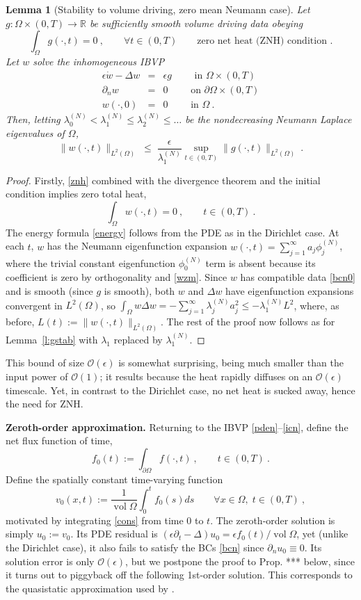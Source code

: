 \documentclass[10pt]{article}
\newcommand{\be}{\begin{equation}}
\newcommand{\ee}{\end{equation}}
\newcommand{\bea}{\begin{eqnarray}}
\newcommand{\eea}{\end{eqnarray}}
\newcommand{\R}{\mathbb{R}}
\newcommand{\bigO}{{\mathcal O}}
\DeclareMathOperator{\vol}{vol}
\newtheorem{lem}[thm]{Lemma}
\newcommand{\pO}{{\partial\Omega}}
\newcommand{\eps}{\epsilon}
\newcommand{\dn}{\partial_n}
\newcommand{\dt}{\partial_t}
\newcommand{\LTO}{{L^2(\Omega)}}
\begin{document}
\begin{lem}[Stability to volume driving, zero mean Neumann case]
  Let $g: \Omega\times(0,T) \to\R$ be sufficiently smooth
  volume driving data obeying
  \be
  \int_\Omega g(\cdot,t)=0~, \qquad \forall t\in(0,T)
  \qquad\mbox{zero net heat (ZNH) condition~.}
  \label{znh}
  \ee
  Let $w$ solve the inhomogeneous IBVP
  \bea
  \eps\dot{w} - \Delta w &=& \eps g    \qquad \mbox{ in } \Omega\times (0,T)
  \\
  \dn w  &=& 0  \qquad \mbox{ on } \pO \times (0,T)
  \label{bcn0}
  \\
  w(\cdot, 0)    &=&  0 \qquad \mbox{ in } \Omega~.
  \eea
  Then, letting $\lambda_0^{(N)}<
  \lambda_1^{(N)} \le \lambda_2^{(N)} \le \dots$
  be the nondecreasing Neumann Laplace eigenvalues of $\Omega$,
  \be
  \|w(\cdot,t)\|_\LTO \;\le\;
  \frac{\eps}{\lambda_1^{(N)}} \sup_{t\in(0,T)} \|g(\cdot,t)\|_\LTO
  ~.
  \label{gstabn}
  \ee
  \label{l:gstabn}
\end{lem}
\begin{proof}
  Firstly, \eqref{znh} combined with the divergence theorem
  and the initial condition implies zero total heat,
  \be
  \int_\Omega w(\cdot,t) = 0 ~, \qquad t \in (0,T)~.
  \label{wzm}
  \ee
  The energy formula \eqref{energy} follows from the PDE
  as in the Dirichlet case.
  At each $t$, $w$ has the Neumann eigenfunction expansion
  $w(\cdot,t) = \sum_{j=1}^\infty a_j \phi_j^{(N)}$, where the
  trivial constant eigenfunction $\phi_0^{(N)}$ term
  is absent because its coefficient is zero by orthogonality and \eqref{wzm}.
  Since $w$ has compatible data \eqref{bcn0} and is smooth
  (since $g$ is smooth),
  both $w$ and $\Delta w$ have eigenfunction expansions convergent
  in $\LTO$, so
  $\int_\Omega w \Delta w = -\sum_{j=1}^\infty \lambda_j^{(N)} a_j^2 \le
  -\lambda_1^{(N)} L^2$,
  where, as before, $L(t) := \|w(\cdot,t)\|_\LTO$.
  The rest of the proof now follows as for Lemma~\ref{l:gstab}
  with $\lambda_1$ replaced by $\lambda_1^{(N)}$.
  \end{proof}

This bound of size $\bigO(\eps)$ is somewhat surprising, being 
much smaller than the input power of $\bigO(1)$;
it results because the heat rapidly diffuses
on an $\bigO(\eps)$ timescale.
Yet, in contrast to the Dirichlet case, no net heat is sucked away, hence
the need for ZNH.

{\bf Zeroth-order approximation.}
Returning to the IBVP \eqref{pden}--\eqref{icn},
define the net flux function of time,
\be
f_0(t) := \int_\pO f(\cdot,t)~, \qquad t\in(0,T)~.
\label{f0}
\ee
Define the spatially constant time-varying function
\be
v_0(x,t) := \frac{1}{\vol\Omega} \int_0^t f_0(s) ds
\qquad \forall x \in \Omega, \; t\in(0,T)~,
\ee
motivated by integrating \eqref{cons} from time 0 to $t$.
The zeroth-order solution is simply $u_0:=v_0$.
Its PDE residual is $(\eps \dt -\Delta)u_0 = \eps f_0(t) / \vol \Omega$,
yet (unlike the Dirichlet case), it also fails to satisfy the BCs \eqref{bcn} since $\dn u_0 \equiv 0$.
Its solution error is only $\bigO(\eps)$, but we postpone the proof
to Prop. *** below,
since it turns out to piggyback off the following 1st-order solution.
This corresponds to the quasistatic approximation used by \cite{diegmiller18}.
\end{document}
